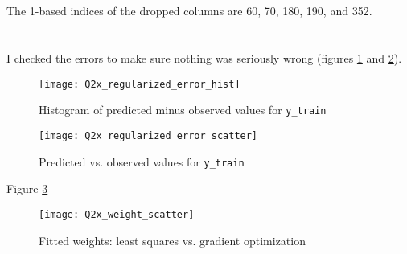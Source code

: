 \documentclass[]{article}
\begin{document}
\subsection{}

The 1-based indices of the dropped columns are 60, 70, 180, 190, and 352.

\section{}

I checked the errors to make sure nothing was seriously wrong (figures \ref{fig:regerrorhist} and \ref{fig:regerrorscatter}).

\begin{figure}
	\texttt{[image: Q2x\_regularized\_error\_hist]}
	\caption{\label{fig:regerrorhist} Histogram of predicted minus observed values for \texttt{y\_train}}
\end{figure}

\begin{figure}
	\texttt{[image: Q2x\_regularized\_error\_scatter]}
	\caption{\label{fig:regerrorscatter} Predicted vs. observed values for \texttt{y\_train}}
\end{figure}

Figure \ref{fig:weightscatter}

\begin{figure}
	\texttt{[image: Q2x\_weight\_scatter]}
	\caption{\label{fig:weightscatter} Fitted weights: least squares vs. gradient optimization}
\end{figure}
\end{document}
